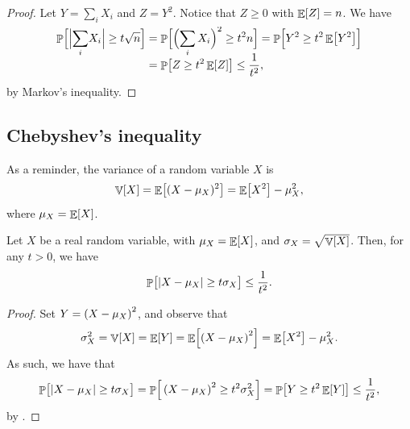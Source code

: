 \begin{proof}
    Let $Y= \sum_i X_i$ and $Z =Y^2$. Notice that $Z \geq 0$ with
    $\mathop{\mathbb{E}}\!\left[ {Z} \right] = n$.  We have
    \begin{align*}
        \Prob{ \cardin{\Bigl.\smash{\sum_i} X_i} \geq t \sqrt{n}}%
        &=%
        \Prob{ \smash{ \Bigl(\sum_i X_i\Bigr)^2 \geq t^2 n} \Bigr.}%
        =%
        \Prob{ Y^2 \geq t^2 \Ex{Y^2} \Bigr.} %
        \\&=%
        \Prob{ Z \geq t^2 \Ex{Z}} %
        \leq%
        \frac{1}{t^2},
    \end{align*}
    by Markov's inequality.
\end{proof}


\subsection{Chebyshev's inequality}

As a reminder, the variance of a random variable $X$ is
\begin{equation*}
    \mathop{\mathbb{V}}\!\left[ { X} \right] = \mathop{\mathbb{E}}\!\left[ { (X -\mu_X)^2 } \right] = \mathop{\mathbb{E}}\!\left[ {X^2} \right] - \mu_X^2,
\end{equation*}
where $\mu_X = \mathop{\mathbb{E}}\!\left[ {X} \right]$.




\begin{fragment}{}
    \begin{theorem}
        Let $X$ be a real random variable, with $\mu_X = \mathop{\mathbb{E}}\!\left[ {X} \right]$, and
        $\sigma_X = \sqrt{\mathop{\mathbb{V}}\!\left[ {X} \right]}$. Then, for any $t > 0$, we have
        \begin{equation*}
            \Prob{\bigl. \cardin{X - \mu_X} \geq t \sigma_X} \leq
            \frac{1}{t^2}.
        \end{equation*}
    \end{theorem}
\end{fragment}



\begin{proof}
    Set $Y = \pth{X - \mu_X}^2$, and observe that
    \begin{equation*}
        \sigma_X^2
        =%
        \Var{X} =
        \Ex{ Y}
        =%
        \Ex{\pth{X - \mu_X}^2}
        =%
        \Ex{X^2}  - \mu_X^2.
    \end{equation*}
    As such, we have that
    \begin{equation*}
        \Prob{\bigl. \cardin{X - \mu_X}\geq t \sigma_X}%
        =%
        \Prob{\,\pth{X - \mu_X}^2\geq t^2 \sigma_X^2}
        =%
        \Prob{ Y \geq t^2 \Ex{Y}\bigl.\!}
        \leq%
        \frac{1}{t^2},
    \end{equation*}
    by .
\end{proof}

